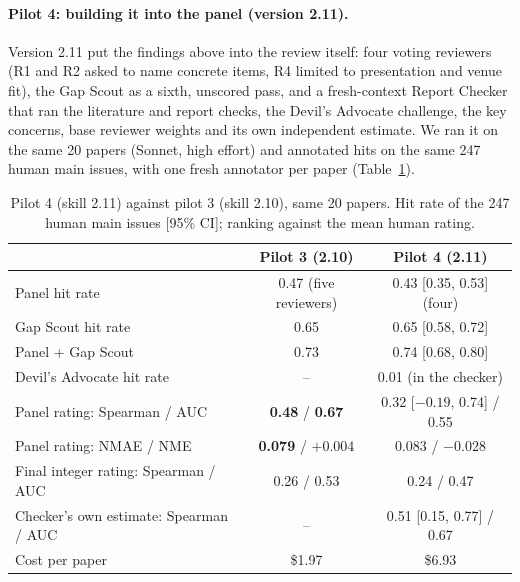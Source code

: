 \documentclass[11pt,a4paper]{article}
\begin{document}
\paragraph{Pilot 4: building it into the panel (version 2.11).}
Version 2.11 put the findings above into the review itself: four voting reviewers (R1 and R2
asked to name concrete items, R4 limited to presentation and venue fit), the Gap Scout as a
sixth, unscored pass, and a fresh-context Report Checker that ran the literature and report
checks, the Devil's Advocate challenge, the key concerns, base reviewer weights and its own
independent estimate. We ran it on the same 20 papers (Sonnet, high effort) and annotated hits
on the same 247 human main issues, with one fresh annotator per paper (Table~\ref{tab:p4}).

\begin{table}[h]
\centering
\small
\caption{Pilot 4 (skill 2.11) against pilot 3 (skill 2.10), same 20 papers. Hit rate of the 247
human main issues [95\% CI]; ranking against the mean human rating.}\label{tab:p4}
\begin{tabular}{lcc}
\toprule
 & Pilot 3 (2.10) & Pilot 4 (2.11)\\
\midrule
Panel hit rate & 0.47 (five reviewers) & 0.43 [0.35, 0.53] (four)\\
Gap Scout hit rate & 0.65 & 0.65 [0.58, 0.72]\\
Panel + Gap Scout & 0.73 & 0.74 [0.68, 0.80]\\
Devil's Advocate hit rate & -- & 0.01 (in the checker)\\
\midrule
Panel rating: Spearman / AUC & \textbf{0.48} / \textbf{0.67} & 0.32 [$-0.19$, 0.74] / 0.55\\
Panel rating: NMAE / NME & \textbf{0.079} / $+0.004$ & 0.083 / $-0.028$\\
Final integer rating: Spearman / AUC & 0.26 / 0.53 & 0.24 / 0.47\\
Checker's own estimate: Spearman / AUC & -- & 0.51 [0.15, 0.77] / 0.67\\
\midrule
Cost per paper & \$1.97 & \$6.93\\
\bottomrule
\end{tabular}
\end{table}
\end{document}
